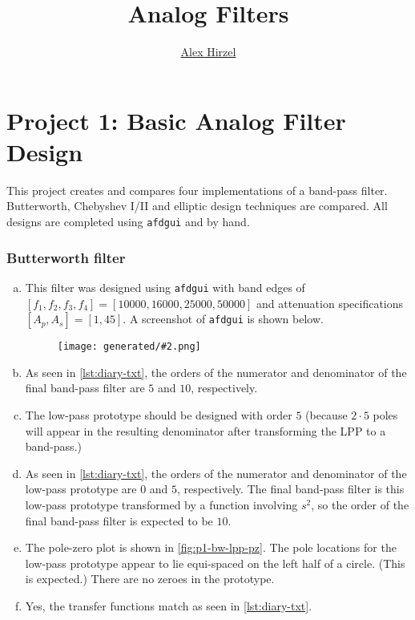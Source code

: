 \documentclass{ajhlabreport}
\title{Analog Filters}
\author{\href{mailto:ahirzel@mtu.edu}{Alex Hirzel}}
\newcommand{\generatedfigw}[2]{
	\texttt{[image: generated/\#2.png]}
}
\begin{document}
\maketitle




\chapter{Project 1: Basic Analog Filter Design}%

This project creates and compares four implementations of a band-pass filter.
Butterworth, Chebyshev I/II and elliptic design techniques are compared. All
designs are completed using \texttt{afdgui} and by hand.


\subsection{Butterworth filter}%

\begin{enumerate}[(a)]
%
\item This filter was designed using \texttt{afdgui} with band edges of $[ f_1,
f_2, f_3, f_4 ] = [ 10000, 16000, 25000, 50000 ]$ and attenuation specifications
$[ A_p, A_s ] = [ 1, 45 ]$. A screenshot of \texttt{afdgui} is shown below.
\begin{figure}[H]\centering\generatedfigw{0.8}{p1a-bw}\end{figure}
%
\item As seen in \autoref{lst:diary-txt}, the orders of the numerator and
denominator of the final band-pass filter are $5$ and $10$, respectively.
%
\item The low-pass prototype should be designed with order $5$ (because $2 \cdot
5$ poles will appear in the resulting denominator after transforming the LPP to
a band-pass.)
%
\item As seen in \autoref{lst:diary-txt}, the orders of the numerator and
denominator of the low-pass prototype are $0$ and $5$, respectively. The final
band-pass filter is this low-pass prototype transformed by a function involving
$s^2$, so the order of the final band-pass filter is expected to be $10$.
%
\item The pole-zero plot is shown in \autoref{fig:p1-bw-lpp-pz}. The pole
locations for the low-pass prototype appear to lie equi-spaced on the left half
of a circle. (This is expected.) There are no zeroes in the prototype.
%
\setcounter{enumi}{6}
\item Yes, the transfer functions match as seen in \autoref{lst:diary-txt}.
%
\end{enumerate}
\end{document}
